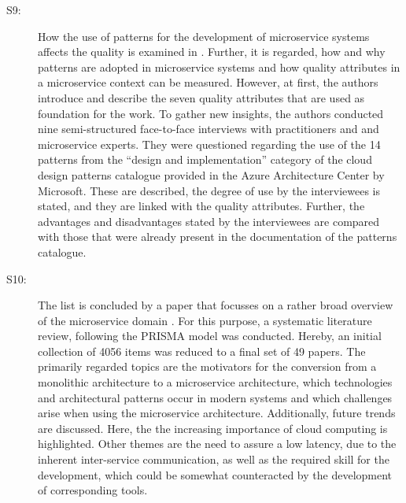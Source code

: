 \documentclass{bmcart}
\begin{document}
\begin{description}
  \item[S9:] How the use of patterns for the development of microservice systems affects the quality is examined in \cite{Vale.2022}. Further, it is regarded, how and why patterns are adopted in microservice systems and how quality attributes in a microservice context can be measured. However, at first, the authors introduce and describe the seven quality attributes that are used as foundation for the work. To gather new insights, the authors conducted nine semi-structured face-to-face interviews with practitioners and and microservice experts. They were questioned regarding the use of the 14 patterns from the “design and implementation” category of the cloud design patterns catalogue \cite{AAC.2022} provided in the Azure Architecture Center by Microsoft. These are described, the degree of use by the interviewees is stated, and they are linked with the quality attributes. Further, the advantages and disadvantages stated by the interviewees are compared with those that were already present in the documentation of the patterns catalogue.
  \item[S10:] The list is concluded by a paper that focusses on a rather broad overview of the microservice domain \cite{Weerasinghe.2022}. For this purpose, a systematic literature review, following the PRISMA model \cite{Page.2021} was conducted. Hereby, an initial collection of 4056 items was reduced to a final set of 49 papers. The primarily regarded topics are the motivators for the conversion from a monolithic architecture to a microservice architecture, which technologies and architectural patterns occur in modern systems and which challenges arise when using the microservice architecture. Additionally, future trends are discussed. Here, the the increasing importance of cloud computing is highlighted. Other themes are the need to assure a low latency, due to the inherent inter-service communication, as well as the required skill for the development, which could be somewhat counteracted by the development of corresponding tools.
\end{description}
\end{document}
